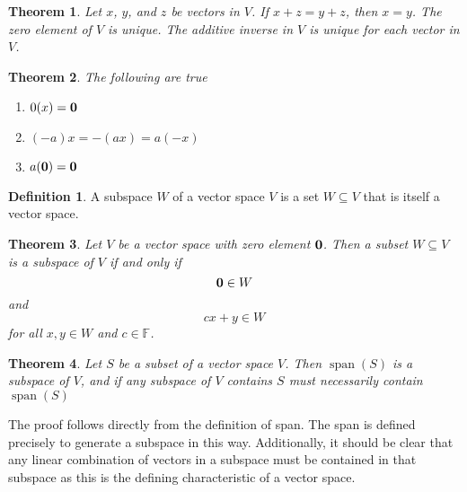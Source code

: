 \documentclass[oneside, 12pt]{book}
\DeclareMathOperator{\spn}{span}
\newtheorem{thm}{Theorem}[section]
\theoremstyle{definition}
\newtheorem{defn}{Definition}[section]
\begin{document}
\begin{thm}
\label{thm_canc}
  Let $x$, $y$, and $z$ be vectors in $V$. If $x+z=y+z$, then $x=y$.
  The zero element of $V$ is unique.
  The additive inverse in $V$ is unique for each vector in $V$.
\end{thm}




\begin{thm}
\label{thm_alg}
The following are true
\begin{enumerate}
  \item $0(x)=\bold{0}$
  \item $(-a)x=-(ax)=a(-x)$
  \item $a(\bold{0})=\bold{0}$
\end{enumerate}
\end{thm}

\begin{defn}
\label{defn_subspace}
  A subspace $W$ of a vector space $V$ is a set $W \subseteq V$ that is itself a vector space.
\end{defn}
\begin{thm}
\label{thm_subspace}
  Let $V$ be a vector space with zero element $\bold{0}$. Then a subset $W \subseteq V$
  is a subspace of $V$ if and only if \[\bold{0} \in W\] and \[cx+y \in W\] for all $x,y \in W$ and $c \in \mathbb{F}$.

\end{thm}
\begin{thm}
\label{thm_spn}
Let $S$ be a subset of a vector space $V$. Then $\spn(S)$ is a subspace of $V$, and if any subspace of $V$ contains $S$ must necessarily contain $\spn(S)$
\end{thm}
The proof follows directly from the definition of span. The span is defined precisely to generate a subspace in this way. Additionally, it should be clear that any linear combination of vectors in a subspace must be contained in that subspace as this is the defining characteristic of a vector space.
\end{document}
